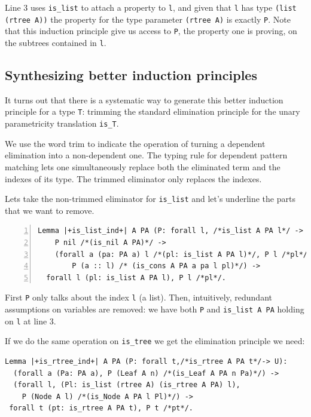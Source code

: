 \documentclass[sigplan,10pt,review]{acmart}\settopmatter{printfolios=true,printccs=false,printacmref=false}
\begin{document}
\noindent
Line 3 uses \lstinline+is_list+ to attach a property to \lstinline+l+,
and given that \lstinline+l+ has type \lstinline+(list (rtree A))+
the property for the type parameter \lstinline+(rtree A)+ is
exactly \lstinline+P+.
Note that this induction principle give us access to \lstinline+P+, the
property one is proving, on the subtrees contained in \lstinline+l+.

\subsection{Synthesizing better induction principles} %

It turns out that there is a systematic way to generate this better
induction principle for a type \lstinline+T+:
trimming the standard elimination principle
for the unary parametricity translation \lstinline+is_T+.

We use the word trim to indicate the operation of turning a
dependent elimination into a non-dependent one. The typing rule
for dependent pattern matching lets one simultaneously replace
both the eliminated term and the indexes of its type. The trimmed
eliminator only replaces the indexes.

Lets take the non-trimmed eliminator for \lstinline+is_list+ and
let's underline the parts that we want to remove.

\begin{lstlisting}[numbers=left]
Lemma |+is_list_ind+| A PA (P: forall l, /*is_list A PA l*/ -> U) :
    P nil /*(is_nil A PA)*/ ->
    (forall a (pa: PA a) l /*(pl: is_list A PA l)*/, P l /*pl*/ ->
        P (a :: l) /* (is_cons A PA a pa l pl)*/) ->
  forall l (pl: is_list A PA l), P l /*pl*/.
\end{lstlisting}

\noindent
First \lstinline+P+ only talks about the index \lstinline+l+ (a list).
Then, intuitively, redundant assumptions on variables are removed:
we have both \lstinline+P+ and \lstinline+is_list A PA+ holding on
\lstinline+l+ at line 3.

If we do the same operation on \lstinline+is_tree+ we get the
elimination principle we need:

\begin{lstlisting}
Lemma |+is_rtree_ind+| A PA (P: forall t,/*is_rtree A PA t*/-> U):
  (forall a (Pa: PA a), P (Leaf A n) /*(is_Leaf A PA n Pa)*/) ->
  (forall l, (Pl: is_list (rtree A) (is_rtree A PA) l),
    P (Node A l) /*(is_Node A PA l Pl)*/) ->
 forall t (pt: is_rtree A PA t), P t /*pt*/.
\end{lstlisting}
\end{document}
